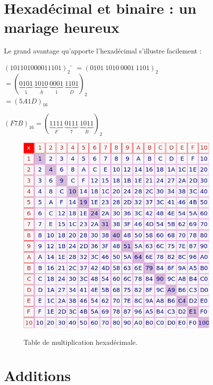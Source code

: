 \section{Hexadécimal et binaire : un mariage heureux}
Le grand avantage qu'apporte l'hexadécimal s'illustre facilement :

\begin{methode}
    \begin{tabbing}
        $(101101000011101)_2$	\=	$=(0101\ 1010\ 0001\ 1101)_2$\\
        \>	$=\left(\underbrace{0101}_5\ \underbrace{1010}_A\ \underbrace{0001}_1\ \underbrace{1101}_D\right)_2$\\
        \>	$=(5A1D)_{16}$
    \end{tabbing}
\end{methode}

\begin{methode}
    $(F7B)_{16}=\left(\underbrace{1111}_F\ \underbrace{0111}_7\ \underbrace{1011}_B\right)_2$
\end{methode}
\begin{figure}
    \begin{center}
        \includegraphics[width=10cm]{bases/img/hexmult.png}\\
        \caption*{Table de multiplication hexadécimale.}
    \end{center}
\end{figure}


\section{Additions}

